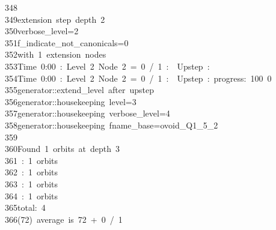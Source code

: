 \begin{tabbing}
348\>\\[0pt]
349\>extension\ step\ depth\ 2\\[0pt]
350\>verbose\_level=2\\[0pt]
351\>f\_indicate\_not\_canonicals=0\\[0pt]
352\>with\ 1\ extension\ nodes\\[0pt]
353\>Time\ 0:00\ :\ Level\ 2\ Node\ 2\ =\ 0\ /\ 1\ :\ \ Upstep\ :\ \\[0pt]
354\>Time\ 0:00\ :\ Level\ 2\ Node\ 2\ =\ 0\ /\ 1\ :\ \ Upstep\ :\ progress:\ 100\ 0\ \ \\[0pt]
355\>generator::extend\_level\ after\ upstep\\[0pt]
356\>generator::housekeeping\ level=3\\[0pt]
357\>generator::housekeeping\ verbose\_level=4\\[0pt]
358\>generator::housekeeping\ fname\_base=ovoid\_Q1\_5\_2\\[0pt]
359\>\\[0pt]
360\>Found\ 1\ orbits\ at\ depth\ 3\\[0pt]
361\ :\ 1\ orbits\\[0pt]
362\ :\ 1\ orbits\\[0pt]
363\ :\ 1\ orbits\\[0pt]
364\ :\ 1\ orbits\\[0pt]
365\>total:\ 4\\[0pt]
366\>(72)\ average\ is\ 72\ +\ 0\ /\ 1\\[0pt]

\end{tabbing}
